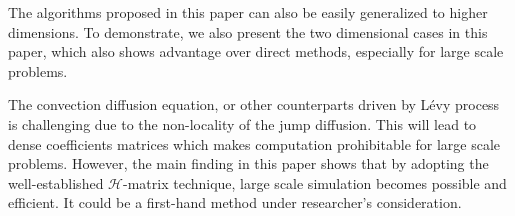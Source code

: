 \documentclass[10pt,a4paper]{article}
\theoremstyle{definition}
\begin{document}
The algorithms proposed in this paper can also be easily generalized to higher dimensions. To demonstrate, we also present the two dimensional cases in this paper, which also shows advantage over direct methods, especially for large scale problems. 

The convection diffusion equation, or other counterparts driven by L\'evy process is challenging due to the non-locality of the jump diffusion. This will lead to dense coefficients matrices which makes computation prohibitable for large scale problems. However, the main finding in this paper shows that by adopting the well-established $\mathcal{H}$-matrix technique, large scale simulation becomes possible and efficient. It could be a first-hand method under researcher's consideration.    
\end{document}
